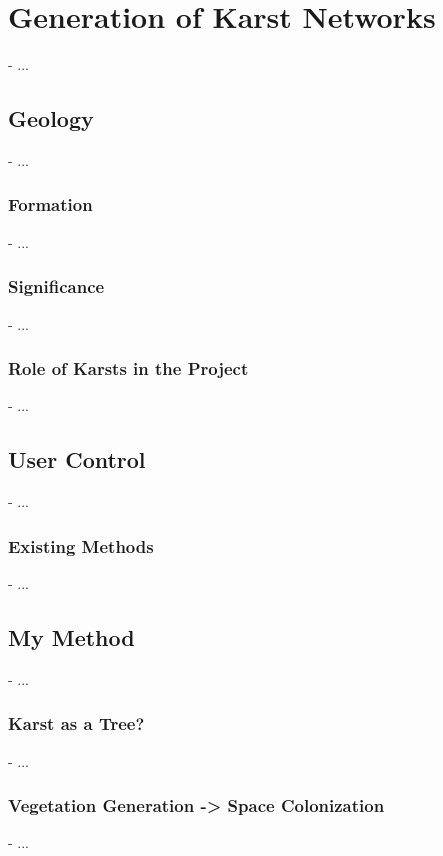 \chapter{Generation of Karst Networks}
\label{chap:karsts}
\minitoc

- ...

\section{Geology}
\label{sec:karsts_geology}
- ...

\subsection{Formation}
- ...

\subsection{Significance}
- ...

\subsection{Role of Karsts in the Project}
- ...

\section{User Control}
\label{sec:karsts_user-control}
- ...

\subsection{Existing Methods}
- ...

\section{My Method}
- ...

\subsection{Karst as a Tree?}
- ...

\subsection{Vegetation Generation -> Space Colonization}
- ...

